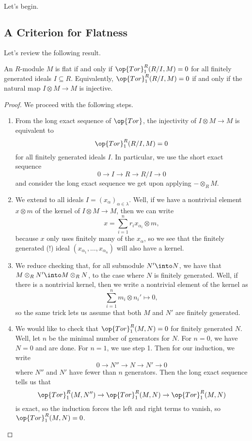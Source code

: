 
Let's begin.

\subsection{A Criterion for Flatness}
Let's review the following result.
\begin{theorem} \label{thm:flatcondition}
	An $R$-module $M$ is flat if and only if $\op{Tor}_1^R(R/I,M)=0$ for all finitely generated ideals $I\subseteq R$. Equivalently, $\op{Tor}_1^R(R/I,M)=0$ if and only if the natural map $I\otimes M\to M$ is injective.
\end{theorem} %
\begin{proof}
	We proceed with the following steps.
	\begin{enumerate}
		\item From the long exact sequence of $\op{Tor}$, the injectivity of $I\otimes M\to M$ is equivalent to
		\[\op{Tor}_1^R(R/I,M)=0\]
		for all finitely generated ideals $I$. In particular, we use the short exact sequence
		\[0\to I\to R\to R/I\to 0\]
		and consider the long exact sequence we get upon applying $-\otimes_RM$.
		\item We extend to all ideals $I=(x_\alpha)_{\alpha\in\lambda}$. Well, if we have a nontrivial element $x\otimes m$ of the kernel of $I\otimes M\to M$, then we can write
		\[x=\sum_{i=1}^nr_ix_{\alpha_i}\otimes m,\]
		because $x$ only uses finitely many of the $x_\alpha$, so we see that the finitely generated (!) ideal $(x_{\alpha_1},\ldots,x_{\alpha_n})$ will also have a kernel.
		\item We reduce checking that, for all submodule $N'\into N$, we have that $M\otimes_RN'\into M\otimes_RN$, to the case where $N$ is finitely generated. Well, if there is a nontrivial kernel, then we write a nontrivial element of the kernel as
		\[\sum_{i=1}^nm_i\otimes n_i'\mapsto0,\]
		so the same trick lets us assume that both $M$ and $N'$ are finitely generated.

		\item We would like to check that $\op{Tor}_1^R(M,N)=0$ for finitely generated $N$. Well, let $n$ be the minimal number of generators for $N$. For $n=0$, we have $N=0$ and are done. For $n=1$, we use step 1. Then for our induction, we write
		\[0\to N''\to N\to N'\to0\]
		where $N''$ and $N'$ have fewer than $n$ generators. Then the long exact sequence tells us that
		\[\op{Tor}_1^R(M,N'')\to\op{Tor}_1^R(M,N)\to\op{Tor}_1^R(M,N)\]
		is exact, so the induction forces the left and right terms to vanish, so $\op{Tor}_1^R(M,N)=0$.
		\qedhere
	\end{enumerate}
\end{proof}
